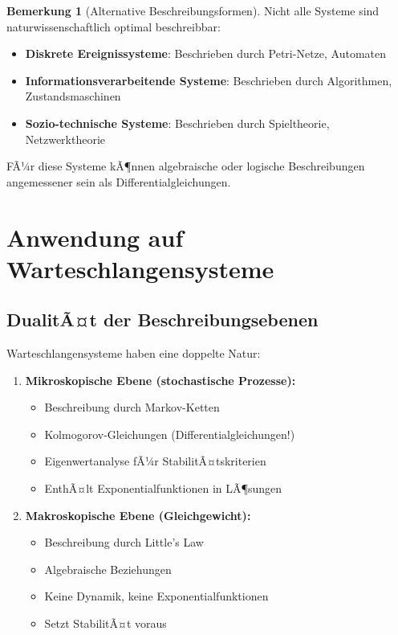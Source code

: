 ﻿\documentclass[a4paper,12pt]{report}
\theoremstyle{definition}
\newtheorem{bemerkung}{Bemerkung}[section]
\begin{document}
\begin{bemerkung}[Alternative Beschreibungsformen]
	Nicht alle Systeme sind naturwissenschaftlich optimal beschreibbar:
	\begin{itemize}
		\item[-] \textbf{Diskrete Ereignissysteme}: Beschrieben durch Petri-Netze, Automaten
		\item[-] \textbf{Informationsverarbeitende Systeme}: Beschrieben durch Algorithmen, Zustandsmaschinen
		\item[-] \textbf{Sozio-technische Systeme}: Beschrieben durch Spieltheorie, Netzwerktheorie
	\end{itemize}
	
	FÃ¼r diese Systeme kÃ¶nnen algebraische oder logische Beschreibungen angemessener sein als Differentialgleichungen.
\end{bemerkung}

\section{Anwendung auf Warteschlangensysteme}

\subsection{DualitÃ¤t der Beschreibungsebenen}

Warteschlangensysteme haben eine doppelte Natur:

\begin{enumerate}
	\item[-] \textbf{Mikroskopische Ebene (stochastische Prozesse):}
	\begin{itemize}
		\item[-] Beschreibung durch Markov-Ketten
		\item[-] Kolmogorov-Gleichungen (Differentialgleichungen!)
		\item[-] Eigenwertanalyse fÃ¼r StabilitÃ¤tskriterien
		\item[-] EnthÃ¤lt Exponentialfunktionen in LÃ¶sungen
	\end{itemize}
	
	\item[-] \textbf{Makroskopische Ebene (Gleichgewicht):}
	\begin{itemize}
		\item[-] Beschreibung durch Little's Law
		\item[-] Algebraische Beziehungen
		\item[-] Keine Dynamik, keine Exponentialfunktionen
		\item[-] Setzt StabilitÃ¤t voraus
	\end{itemize}
\end{enumerate}
\end{document}
